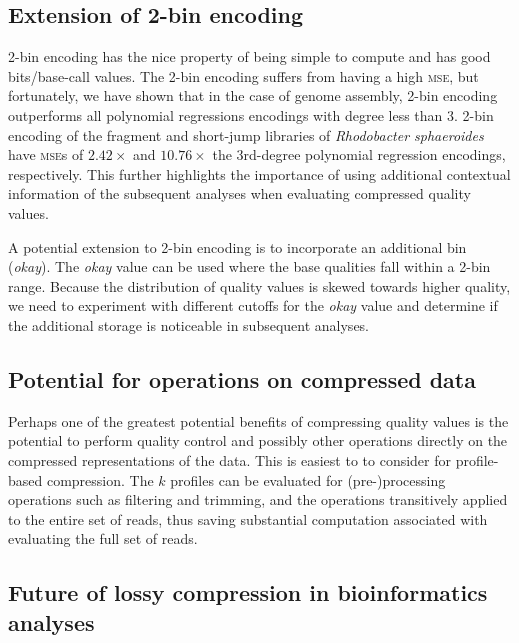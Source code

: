 \documentclass{bioinfo}
\begin{document}
\subsection{Extension of 2-bin encoding}

2-bin encoding has the nice property of being simple to compute and
has good bits/base-call values. The 2-bin encoding suffers from having
a high \textsc{mse}, but fortunately, we have shown that in the case
of genome assembly, 2-bin encoding outperforms all polynomial
regressions encodings with degree less than 3. 2-bin encoding of the
fragment and short-jump libraries of \textit{Rhodobacter sphaeroides}
have \textsc{mse}s of $2.42\times$ and $10.76\times$ the 3rd-degree
polynomial regression encodings, respectively. This further highlights
the importance of using additional contextual information of the
subsequent analyses when evaluating compressed quality values.

A potential extension to 2-bin encoding is to incorporate an
additional bin (\emph{okay}). The \emph{okay} value can be used where
the base qualities fall within a 2-bin range. Because the distribution
of quality values is skewed towards higher quality, we need to
experiment with different cutoffs for the \emph{okay} value and
determine if the additional storage is noticeable in subsequent
analyses.

\subsection{Potential for operations on compressed data}

Perhaps one of the greatest potential benefits of compressing quality
values is the potential to perform quality control and possibly other
operations directly on the compressed representations of the
data. This is easiest to to consider for profile-based
compression. The $k$ profiles can be evaluated for (pre-)processing
operations such as filtering and trimming, and the operations
transitively applied to the entire set of reads, thus saving
substantial computation associated with evaluating the full set of
reads.

\subsection{Future of lossy compression in bioinformatics analyses}
\end{document}
